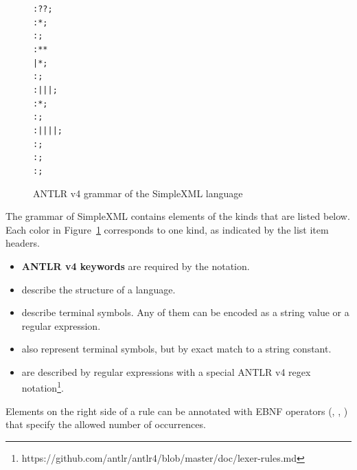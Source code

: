 \begin{figure}[ht]
\vspace{-2mm}
\centering
\begin{alltt}
\small
{}  : ? ?  ;
    :  *  ;
   : \antlrliteral{<!--}  \antlrliteral{-->} ;
   : \antlrliteral{<}  * \antlrliteral{>} * \antlrliteral{</}  \antlrliteral{>}
          |  \antlrliteral{<}  * \antlrliteral{/>} ;
      :     ;
   :  |  |  |  ;
      :  * ;
     : \antlrregex{[0-9]} ;
  :  | \antlrliteral{-} | \antlrliteral{\_} |  |  ;
  : \antlrregex{[:a-zA-Z]} ;
      : \antlrregex{~[<"]*} ;
     : \antlrliteral{<![CDATA[}  \antlrliteral{]]>} ;
\end{alltt}
\caption{ANTLR v4 grammar of the SimpleXML language}
\label{fig:SIMPLEXML}
\vspace{-2mm}
\end{figure}

The grammar of SimpleXML contains elements of the kinds that are listed below.
Each color in Figure~\ref{fig:SIMPLEXML} corresponds to one kind, as indicated by the list item headers.
\begin{itemize}
	\item \textbf{ANTLR v4 keywords} are required by the notation.
	\item {} describe the structure of a language.
	\item {} describe terminal symbols.
		Any of them can be encoded as a string value or a regular expression.
	\item {} also represent terminal symbols, but by exact match to a string constant.
	\item {} are described by regular expressions with a special ANTLR v4 regex notation\footnote{https://github.com/antlr/antlr4/blob/master/doc/lexer-rules.md}.
\end{itemize}
Elements on the right side of a rule can be annotated with EBNF operators (, \code{+}, \code{*}) that specify the allowed number of occurrences.

